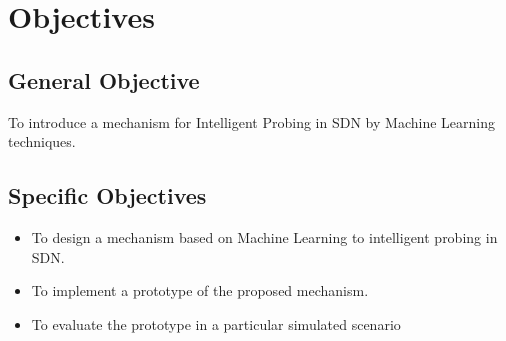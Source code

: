 \section{Objectives}
\label{sec:objectives}

\subsection{General Objective}

To introduce a mechanism for Intelligent Probing in SDN by Machine Learning techniques.

\subsection{Specific Objectives}

\begin{itemize}
    \item To design a mechanism based on Machine Learning to intelligent probing in SDN.
    \item To implement a prototype of the proposed mechanism.
    \item To evaluate the prototype in a particular simulated scenario
\end{itemize}